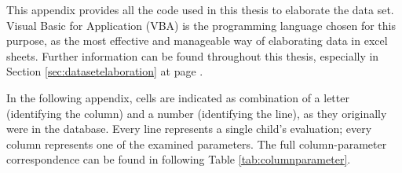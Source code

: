 \label{chap:appendixvbaexpressions}
This appendix provides all the code used in this thesis to elaborate the data set. Visual Basic for Application (VBA) is the programming language chosen for this purpose, as the most effective and manageable way of elaborating data in excel sheets. Further information can be found throughout this thesis, especially in Section \ref{sec:datasetelaboration} at page \pageref{sec:datasetelaboration}.

In the following appendix, cells are indicated as combination of a letter (identifying the column) and a number (identifying the line), as they originally were in the database. Every line represents a single child's evaluation; every column represents one of the examined parameters. The full column-parameter correspondence can be found in following Table \ref{tab:columnparameter}.


